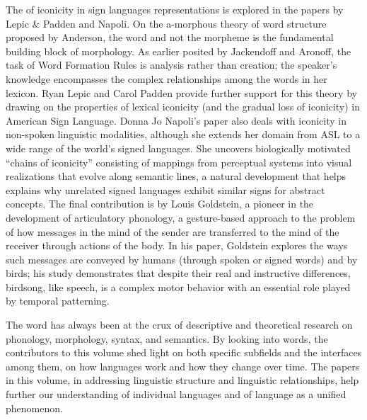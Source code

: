 \begin{refsection}
The of iconicity in sign languages representations is explored in the papers by Lepic \& Padden and Napoli.  On the a-morphous theory of word structure proposed by Anderson, the word and not the morpheme is the fundamental building block of morphology. As earlier posited by Jackendoff and Aronoff, the task of Word Formation Rules is analysis rather than creation; the speaker's knowledge encompasses the complex relationships among the words in her lexicon. Ryan Lepic and Carol Padden provide further support for this theory by drawing on the properties of lexical iconicity (and the gradual loss of iconicity) in American Sign Language. Donna Jo Napoli's paper also deals with iconicity in non-spoken linguistic modalities, although she extends her domain from ASL to a wide range of the world's signed languages. She uncovers biologically motivated “chains of iconicity” consisting of mappings from perceptual systems into visual realizations that evolve along semantic lines, a natural development that helps explains why unrelated signed languages exhibit similar signs for abstract concepts. The final contribution is by Louis Goldstein, a pioneer in the development of articulatory phonology, a gesture-based approach to the problem of how messages in the mind of the sender are transferred to the mind of the receiver through actions of the body. In his paper, Goldstein explores the ways such messages are conveyed by humans (through spoken or signed words) and by birds; his study demonstrates that despite their real and instructive differences, birdsong, like speech, is a complex motor behavior with an essential role played by temporal patterning. 


The word has always been at the crux of descriptive and theoretical research on phonology, morphology, syntax, and semantics. By looking into words, the contributors to this volume shed light on both specific subfields and the interfaces among them, on how languages work and how they change over time.  The papers in this volume, in addressing linguistic structure and linguistic relationships, help further our understanding of individual languages and of language as a unified phenomenon.  

\end{refsection}

